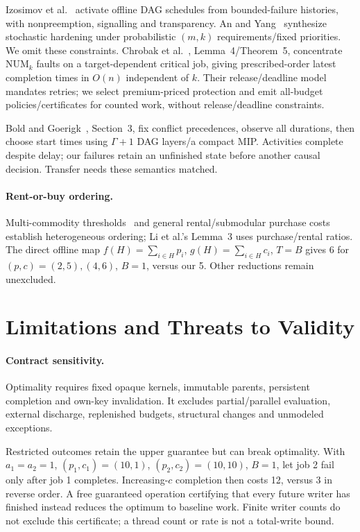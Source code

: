 \documentclass[acmsmall,screen,review,anonymous]{acmart}
\begin{document}
Izosimov et al.~\cite{izosimov} activate offline DAG schedules from bounded-failure histories, with nonpreemption, signalling and transparency. An and Yang~\cite{an} synthesize stochastic hardening under probabilistic $(m,k)$ requirements/fixed priorities. We omit these constraints. Chrobak et al.~\cite{chrobak}, Lemma~4/Theorem~5, concentrate $\mathrm{NUM}_k$ faults on a target-dependent critical job, giving prescribed-order latest completion times in $O(n)$ independent of $k$. Their release/deadline model mandates retries; we select premium-priced protection and emit all-budget policies/certificates for counted work, without release/deadline constraints.

Bold and Goerigk~\cite{bold}, Section~3, fix conflict precedences, observe all durations, then choose start times using $\Gamma+1$ DAG layers/a compact MIP. Activities complete despite delay; our failures retain an unfinished state before another causal decision. Transfer needs these semantics matched.

\paragraph{Rent-or-buy ordering.}
Multi-commodity thresholds~\cite{wu} and general rental/submodular purchase costs~\cite{li} establish heterogeneous ordering; Li et al.'s Lemma~3 uses purchase/rental ratios. The direct offline map $f(H)=\sum_{i\in H}p_i$, $g(H)=\sum_{i\in H}c_i$, $T=B$ gives 6 for $(p,c)=(2,5),(4,6)$, $B=1$, versus our 5. Other reductions remain unexcluded.

\section{Limitations and Threats to Validity}
\label{sec:limits}

\paragraph{Contract sensitivity.}
Optimality requires fixed opaque kernels, immutable parents, persistent completion and own-key invalidation. It excludes partial/parallel evaluation, external discharge, replenished budgets, structural changes and unmodeled exceptions.

Restricted outcomes retain the upper guarantee but can break optimality. With $a_1=a_2=1$, $(p_1,c_1)=(10,1)$, $(p_2,c_2)=(10,10)$, $B=1$, let job 2 fail only after job 1 completes. Increasing-$c$ completion then costs 12, versus 3 in reverse order. A free guaranteed operation certifying that every future writer has finished instead reduces the optimum to baseline work. Finite writer counts do not exclude this certificate; a thread count or rate is not a total-write bound.
\end{document}
